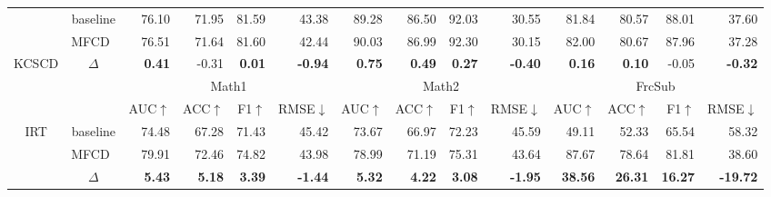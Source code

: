 \documentclass[a4paper,runningheads]{llncs}
\def\mymethod{MFCD}
\newcommand{\redbf}[1]{\textcolor{myred}{\textbf{#1}}} %
\newcommand{\green}[1]{\textcolor{mygreen}{#1}}       %
\begin{document}
\begin{table}[!t]
{\begin{tabular}{cc|rrrr|rrrr|rrrr}
& baseline & 76.10 & 71.95 & 81.59 & 43.38 & 89.28 & 86.50 & 92.03 & 30.55 & 81.84 & 80.57 & 88.01 & 37.60 \\
 & \mymethod\ & 76.51 & 71.64 & 81.60 & 42.44 & 90.03 & 86.99 & 92.30 & 30.15 & 82.00 & 80.67 & 87.96 & 37.28 \\
\multirow{-3}{*}{KCSCD} & $\Delta$ & \redbf{0.41} & \green{-0.31} & \redbf{0.01} & \redbf{-0.94} & \redbf{0.75} & \redbf{0.49} & \redbf{0.27} & \redbf{-0.40} & \redbf{0.16} & \redbf{0.10} & \green{-0.05} & \redbf{-0.32} \\
\midrule
& & \multicolumn{4}{c|}{Math1} & \multicolumn{4}{c|}{Math2} & \multicolumn{4}{c}{FrcSub} \\
\cmidrule(lr){3-14}
 & & AUC$\uparrow$ & ACC$\uparrow$ & F1$\uparrow$ & RMSE$\downarrow$ & AUC$\uparrow$ & ACC$\uparrow$ & F1$\uparrow$ & RMSE$\downarrow$ & AUC$\uparrow$ & ACC$\uparrow$ & F1$\uparrow$ & RMSE$\downarrow$ \\
\midrule
\multirow{3}{*}{IRT} & baseline & 74.48 & 67.28 & 71.43 & 45.42 & 73.67 & 66.97 & 72.23 & 45.59 & 49.11 & 52.33 & 65.54 & 58.32 \\
 & \mymethod\ & 79.91 & 72.46 & 74.82 & 43.98 & 78.99 & 71.19 & 75.31 & 43.64 & 87.67 & 78.64 & 81.81 & 38.60 \\
 & $\Delta$ & \redbf{5.43} & \redbf{5.18} & \redbf{3.39} & \redbf{-1.44} & \redbf{5.32} & \redbf{4.22} & \redbf{3.08} & \redbf{-1.95} & \redbf{38.56} & \redbf{26.31} & \redbf{16.27} & \redbf{-19.72} \\


\end{tabular}}
\end{table}
\end{document}
